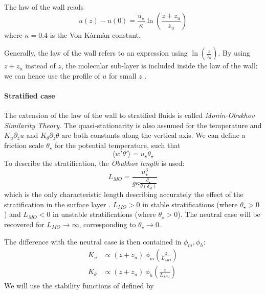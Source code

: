 The law of the wall reads
\begin{equation}
	\label{eq:airseaSCM_LawOfWallProfile}
	u(z) - u(0) = \frac{u_\star}{\kappa} \ln(\frac{z+z_u}{z_u})
\end{equation}
where $\kappa = 0.4$ is the Von Kàrmàn constant.
\begin{remark}
	Generally, the law of the wall
	refers to an expression using
	$\ln(\frac{z}{z_u})$. By using $z+z_u$
	instead of $z$,
	the molecular sub-layer is included
	inside the law of the wall: we can hence
	use the profile of $u$ for small $z$
	\citep{pelletier_two-sided_2021}.
\end{remark}
\paragraph{Stratified case}
The extension of the law of the wall to stratified
fluids is called \textit{Monin-Obukhov Similarity Theory}.
The quasi-stationarity is also assumed for the temperature
and $K_u \partial_z u$ and $K_\theta \partial_z \theta$
are both constants along the vertical axis.
We can define a friction scale $\theta_\star$
for the potential temperature, such that
\begin{equation}
	\langle w' \theta' \rangle = u_\star \theta_\star
\end{equation}
To describe the stratification, the \textit{Obukhov length}
is used:
\begin{equation}
	L_{MO} = \frac{u_\star^3}{g \kappa
	\frac{\theta_\star}{\theta(\delta_{sl})}}
\end{equation}
which is the only characteristic length describing
accurately the effect of the stratification in
the surface layer \citep{obukhov_turbulence_1946}.
$L_{MO}>0$ in stable stratifications
(where $\theta_\star>0$)
and $L_{MO}<0$ in unstable stratifications
(where $\theta_\star>0$).
The neutral case will be recovered
for $L_{MO} \rightarrow \infty$, corresponding
to $\theta_\star \rightarrow 0$.
\par
The difference with the neutral case is then contained
in  $\phi_m, \phi_h$:
\begin{equation}
\begin{aligned}
	K_u &\propto (z+z_u)~ \phi_m(\frac{z}{L_{MO}}) \\
	K_\theta &\propto (z+z_u)~ \phi_h(\frac{z}{L_{MO}})
\end{aligned}
\end{equation}
We will use the stability functions of
\citep{hogstrom_non-dimensional_1988} defined by
